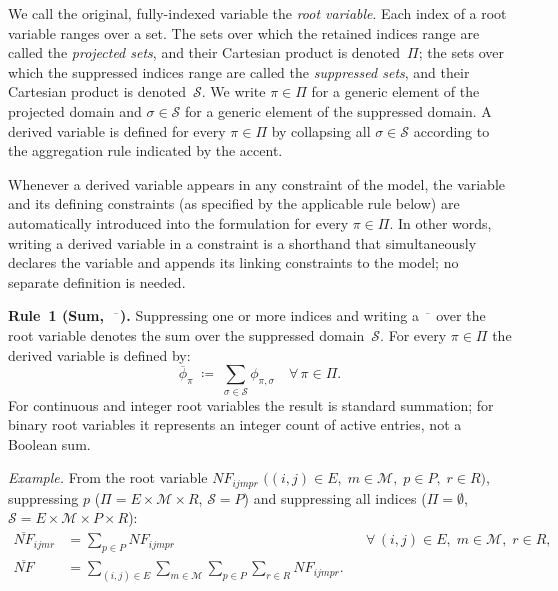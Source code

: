 \begin{convention}
\label{conv:notation}

We call the original, fully-indexed variable the \emph{root variable}.
Each index of a root variable ranges over a set. The sets over which
the retained indices range are called the \emph{projected sets}, and
their Cartesian product is denoted~$\Pi$; the sets over which the
suppressed indices range are called the \emph{suppressed sets}, and
their Cartesian product is denoted~$\mathcal{S}$. We write
$\pi\in\Pi$ for a generic element of the projected domain and
$\sigma\in\mathcal{S}$ for a generic element of the suppressed domain.
A derived variable is defined for every $\pi\in\Pi$ by collapsing all
$\sigma\in\mathcal{S}$ according to the aggregation rule indicated by
the accent.

Whenever a derived variable appears in any constraint of the model,
the variable and its defining constraints (as specified by the
applicable rule below) are automatically introduced into the
formulation for every $\pi\in\Pi$. In other words, writing a derived
variable in a constraint is a shorthand that simultaneously declares
the variable and appends its linking constraints to the model; no
separate definition is needed.

\medskip
\noindent\textbf{Rule~1 \textnormal{(Sum,~$\overline{\phantom{x}}$).}}
Suppressing one or more indices and writing a
$\overline{\phantom{x}}$ over the root variable denotes the sum over
the suppressed domain~$\mathcal{S}$. For every $\pi\in\Pi$ the
derived variable is defined by:
\[
  \overline{\phi}_{\pi}
  \;\coloneqq\;
  \sum_{\sigma\in\mathcal{S}} \phi_{\pi,\sigma}
  \quad \forall\,\pi\in\Pi.
\]
For continuous and integer root variables the result is standard
summation; for binary root variables it represents an integer count of
active entries, not a Boolean sum.

\smallskip\noindent\textit{Example.}
From the root variable $NF_{ijmpr}$
$\bigl((i,j)\!\in\!E,\;m\!\in\!\mathcal{M},\;p\!\in\!P,
  \;r\!\in\!R\bigr)$, suppressing $p$
($\Pi=E\times\mathcal{M}\times R$, $\mathcal{S}=P$) and
suppressing all indices
($\Pi=\emptyset$, $\mathcal{S}=E\times\mathcal{M}\times P\times R$):
\begin{align}
  \overline{NF}_{ijmr}
  &= \sum_{p\in P} NF_{ijmpr}
  && \forall\,(i,j)\in E,\;m\in\mathcal{M},\;r\in R,
  \label{eq:sum-ex1} \\[4pt]
  \overline{NF}
  &= \sum_{(i,j)\in E}\sum_{m\in\mathcal{M}}\sum_{p\in P}\sum_{r\in R} NF_{ijmpr}.
  \label{eq:sum-ex2}
\end{align}

\end{convention}
